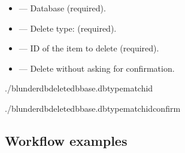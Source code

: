 \documentclass[letterpaper,10pt,english]{sphinxmanual}
\begin{document}
\sphinxAtStartPar
{}
\begin{itemize}
\item {} 
\sphinxAtStartPar
{} — Database (required).

\item {} 
\sphinxAtStartPar
{} — Delete type:  (required).

\item {} 
\sphinxAtStartPar
{} — ID of the item to delete (required).

\item {} 
\sphinxAtStartPar
{} — Delete without asking for confirmation.

\end{itemize}

\sphinxAtStartPar
{}

\begin{sphinxVerbatim}[commandchars=\\\{\}]
./blunderdbdelete\PYGZhy{}\PYGZhy{}dbbase.db\PYGZhy{}\PYGZhy{}typematch\PYGZhy{}\PYGZhy{}id

./blunderdbdelete\PYGZhy{}\PYGZhy{}dbbase.db\PYGZhy{}\PYGZhy{}typematch\PYGZhy{}\PYGZhy{}id\PYGZhy{}\PYGZhy{}confirm
\end{sphinxVerbatim}


\subsection{Workflow examples}
\label{\detokenize{cli:exemples-de-flux-de-travail}}
\end{document}
